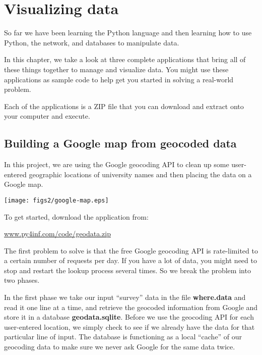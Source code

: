 
\chapter{Visualizing data}

So far we have been learning the Python language and then 
learning how to use Python, the network, and databases 
to manipulate data.

In this chapter, we take a look at three 
complete applications that bring all of these things together
to manage and visualize data.  You  might use these applications 
as sample code to help get you started in solving a
real-world problem.

Each of the applications is a ZIP file that you can download
and extract onto your computer and execute.

\section{Building a Google map from geocoded data}

In this project, we are using the Google geocoding API
to clean up some user-entered geographic locations of 
university names and then placing the data on a Google
map.  

\beforefig
\centerline{\texttt{[image: figs2/google-map.eps]}}
\afterfig

To get started, download the application from:

\url{www.py4inf.com/code/geodata.zip}

The first problem to solve is that the free Google geocoding
API is rate-limited to a certain number of requests per day.  If you have
a lot of data, you might need to stop and restart the lookup
process several times.  So we break the problem into two
phases.  

In the first phase we take our input ``survey'' data in the file
{\bf where.data} and read it one line at a time, and retrieve the
geocoded information from Google and store it 
in a database {\bf geodata.sqlite}.
Before we use the geocoding API for each user-entered location, 
we simply check to see if we already have the data for that 
particular line of input.  The database is functioning as a 
local ``cache'' of our geocoding data to make sure we never ask 
Google for the same data twice.

